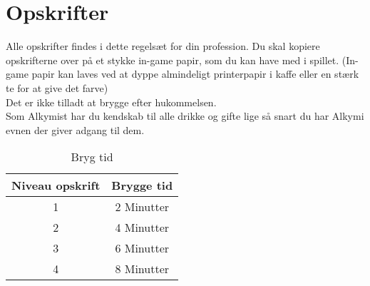 \chapter{Opskrifter}
Alle opskrifter findes i dette regelsæt for din profession. Du skal kopiere opskrifterne over på et stykke in-game papir, som du kan have med i spillet. (In-game papir kan laves ved at dyppe almindeligt printerpapir i kaffe eller en stærk te for at give det farve)\\
Det er ikke tilladt at brygge efter hukommelsen.\\ Som Alkymist har du kendskab til alle drikke og gifte lige så snart du har Alkymi evnen der giver adgang til dem.\\
\begin{table}[H]
    \centering
    \begin{tabular}{|c|c|}
    \hline
    \rowcolor{cerulean!80}
        Niveau opskrift & Brygge tid \\\hline
        1 & 2 Minutter\\\hline
        2 & 4 Minutter \\\hline
        3 & 6 Minutter \\\hline
        4 & 8 Minutter \\\hline
    \end{tabular}
    \caption{Bryg tid}
    \label{tab:my_label}
\end{table}


